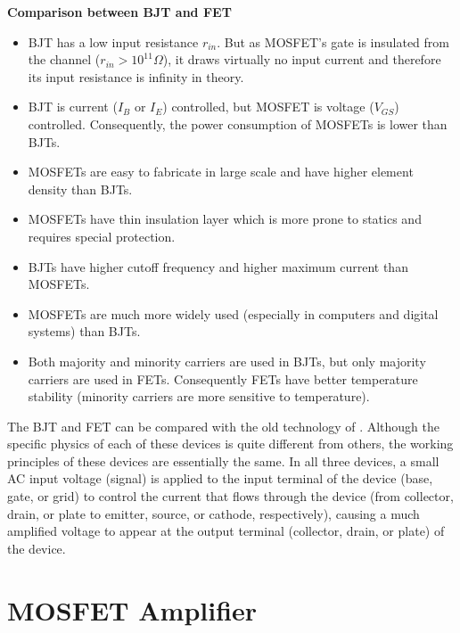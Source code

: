 \begin{itemize}
{\bf Comparison between BJT and FET}

\begin{itemize}
\item BJT has a low input resistance $r_{in}$. But as MOSFET's gate is
  insulated from the channel ($r_{in}>10^{11} \Omega$), it draws virtually
  no input current and therefore its input resistance is infinity in theory.
\item BJT is current ($I_B$ or $I_E$) controlled, but MOSFET is voltage 
  ($V_{GS}$) controlled. Consequently, the power consumption of MOSFETs 
  is lower than BJTs.
\item MOSFETs are easy to fabricate in large scale and have higher element
  density than BJTs.
\item MOSFETs have thin insulation layer which is more prone to statics
  and requires special protection. 
\item BJTs have higher cutoff frequency and higher maximum current than 
  MOSFETs.
\item MOSFETs are much more widely used (especially in computers and 
  digital systems) than BJTs.
\item Both majority and minority carriers are used in BJTs, but only 
  majority carriers are used in FETs. Consequently FETs have better
  temperature stability (minority carriers are more sensitive to
  temperature).
  
\end{itemize}

The BJT and FET can be compared with the old technology of 
.
Although the specific physics of each of these devices is quite different 
from others, the working principles of these devices are essentially the 
same. In all three devices, a small AC input voltage (signal) is applied
to the input terminal of the device (base, gate, or grid) to control the
current that flows through the device (from collector, drain, or plate to 
emitter, source, or cathode, respectively), causing a much amplified voltage
to appear at the output terminal (collector, drain, or plate) of the device.


\section{MOSFET Amplifier}



\end{itemize}
